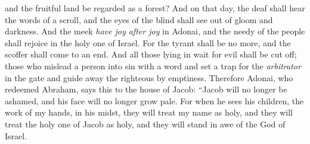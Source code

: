 \begin{biblechapter}
and the fruitful land be regarded as a forest?
\verse And on that day, the deaf shall hear the words of a scroll, 
and the eyes of the blind shall see out of gloom and darkness.
\verse And the meek \textit{have joy after joy} in Adonai, 
and the needy of the people shall rejoice in the holy one of Israel.
\verse For the tyrant shall be no more, 
and the scoffer shall come to an end. 
And all those lying in wait for evil shall be cut off;
\verse those who mislead a person into sin with a word 
and set a trap for the \textit{arbitrator} in the gate 
and guide away the righteous by emptiness.
\verse Therefore Adonai, who redeemed Abraham, says this to the house of Jacob:
\verse “Jacob will no longer be ashamed, 
and his face will no longer grow pale.
\verse For when he sees his children, 
the work of my hands, in his midst, 
they will treat my name as holy, 
and they will treat the holy one of Jacob as holy, 
and they will stand in awe of the God of Israel.
\end{biblechapter}

